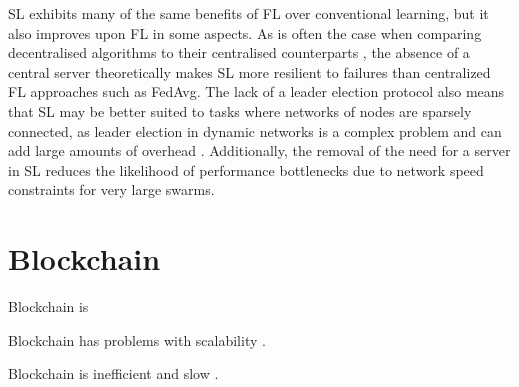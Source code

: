 SL exhibits many of the same benefits of FL over conventional learning, but it also improves upon FL in some aspects. As is often the case when comparing decentralised algorithms to their centralised counterparts \cite{swarm_resil}, the absence of a central server theoretically makes SL more resilient to failures than centralized FL approaches such as FedAvg. The lack of a leader election protocol also means that SL may be better suited to tasks where networks of nodes are sparsely connected, as leader election in dynamic networks is a complex problem and can add large amounts of overhead \cite{leaderelection}. Additionally, the removal of the need for a server in SL reduces the likelihood of performance bottlenecks due to network speed constraints for very large swarms.

\section{Blockchain} \label{bg:bc}

Blockchain is   \cite{blockchain_review}

Blockchain has problems with scalability  \cite{blockchain_scale}.

Blockchain is inefficient and slow  \cite{blockchain_scale}.